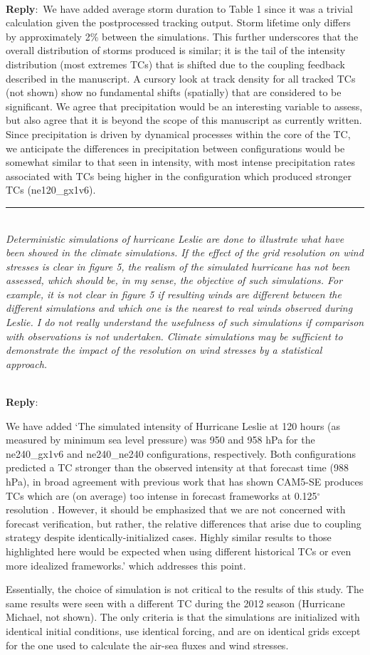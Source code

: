 \documentclass{article}
\newcommand{\genDisc}[1]{\medskip \hrule \noindent \\
               {\itshape #1}}
\newcommand{\reply}{\noindent \\ \textbf{Reply}:\ }
\newcommand{\degree}{$^{\circ}$}
\begin{document}
\reply{We have added average storm duration to Table 1 since it was a trivial calculation given the postprocessed tracking output. Storm lifetime only differs by approximately 2\% between the simulations. This further underscores that the overall distribution of storms produced is similar; it is the tail of the intensity distribution (most extremes TCs) that is shifted due to the coupling feedback described in the manuscript. A cursory look at track density for all tracked TCs (not shown) show no fundamental shifts (spatially) that are considered to be significant. We agree that precipitation would be an interesting variable to assess, but also agree that it is beyond the scope of this manuscript as currently written. Since precipitation is driven by dynamical processes within the core of the TC, we anticipate the differences in precipitation between configurations would be somewhat similar to that seen in intensity, with most intense precipitation rates associated with TCs being higher in the configuration which produced stronger TCs (ne120\_gx1v6).}

\genDisc{Deterministic simulations of hurricane Leslie are done to illustrate what have been showed in the climate simulations. If the effect of the grid resolution on wind stresses is clear in figure 5, the realism of the simulated hurricane has not been assessed, which should be, in my sense, the objective of such simulations. For example, it is not clear in figure 5 if resulting winds are different between the different simulations and which one is the nearest to real winds observed during Leslie. I do not really understand the usefulness of such simulations if comparison with observations is not undertaken. Climate simulations may be sufficient to demonstrate the impact of the resolution on wind stresses by a statistical approach.}

\reply{We have added `The simulated intensity of Hurricane Leslie at 120 hours (as measured by minimum sea level pressure) was 950 and 958 hPa for the ne240\_gx1v6 and ne240\_ne240 configurations, respectively. Both configurations predicted a TC stronger than the observed intensity at that forecast time (988 hPa), in broad agreement with previous work that has shown CAM5-SE produces TCs which are (on average) too intense in forecast frameworks at 0.125\degree{} resolution \citep{Zarzycki2015TCForecast}. However, it should be emphasized that we are not concerned with forecast verification, but rather, the relative differences that arise due to coupling strategy despite identically-initialized cases. Highly similar results to those highlighted here would be expected when using different historical TCs or even more idealized frameworks.' which addresses this point.

Essentially, the choice of simulation is not critical to the results of this study. The same results were seen with a different TC during the 2012 season (Hurricane Michael, not shown). The only criteria is that the simulations are initialized with identical initial conditions, use identical forcing, and are on identical grids except for the one used to calculate the air-sea fluxes and wind stresses.}
\end{document}
